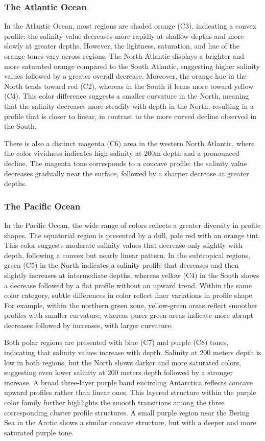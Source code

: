 \documentclass[11pt]{article}
\theoremstyle{plain}
\begin{document}
\subsubsection*{The Atlantic Ocean}
In the Atlantic Ocean, most regions are shaded orange (C3), indicating a convex profile: the salinity value decreases more rapidly at shallow depths and more slowly at greater depths. However, the lightness, saturation, and hue of the orange tones vary across regions. The North Atlantic displays a brighter and more saturated orange compared to the South Atlantic, suggesting higher salinity values followed by a greater overall decrease. Moreover, the orange hue in the North tends toward red (C2), whereas in the South it leans more toward yellow (C4). This color difference suggests a smaller curvature in the North, meaning that the salinity decreases more steadily with depth in the North, resulting in a profile that is closer to linear, in contrast to the more curved decline observed in the South. 

There is also a distinct magenta (C6) area in the western North Atlantic, where the color vividness indicates high salinity at $200$m depth and a pronounced decline. The magenta tone corresponds to a concave profile: the salinity value decreases gradually near the surface, followed by a sharper decrease at greater depths.

\subsubsection*{The Pacific Ocean}

In the Pacific Ocean, the wide range of colors reflects a greater diversity in profile shapes. The equatorial region is presented by a dull, pale red with an orange tint. This color suggests moderate salinity values that decrease only slightly with depth, following a convex but nearly linear pattern. In the subtropical regions, green (C5) in the North indicates a salinity profile that decreases and then slightly increases at intermediate depths, whereas yellow (C4) in the South shows a decrease followed by a flat profile without an upward trend. Within the same color category, subtle differences in color reflect finer variations in profile shape. For example, within the northern green zone, yellow-green areas reflect smoother profiles with smaller curvature, whereas purer green areas indicate more abrupt decreases followed by increases, with larger curvature.

Both polar regions are presented with blue (C7) and purple (C8) tones, indicating that salinity values increase with depth. Salinity at 200 meters depth is low in both regions, but the North shows darker and more saturated colors, suggesting even lower salinity at 200 meters depth followed by a stronger increase. A broad three-layer purple band encircling Antarctica reflects concave upward profiles rather than linear ones. This layered structure within the purple color family further highlights the smooth transitions among the three corresponding cluster profile structures. A small purple region near the Bering Sea in the Arctic shows a similar concave structure, but with a deeper and more saturated purple tone.
\end{document}
